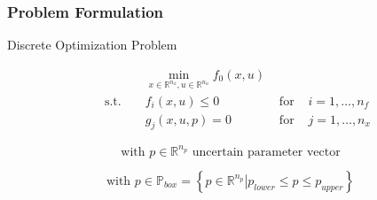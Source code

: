 

\begin{frame}
\frametitle{Problem Formulation}

\begin{block}{Discrete Optimization Problem}
	
\begin{align*}
 &&& \min_{x\in \mathbb{R}^{n_{x}}, u\in \mathbb{R}^{n_{u}}}  f_{0}(x, u)\\
& \text{ s.t. } &&  f_{i}(x,u) \leq 0 & \text{ for } & i=1,\ldots,n_{f}\\
&&&  g_{j}(x,u,p)=0 & \text{ for } & j=1,\ldots,n_{x}
\end{align*}
\begin{overprint}
\begin{equation*}
\text{with } p\in \mathbb{R}^{n_{p}} \text{ uncertain parameter vector}
\end{equation*}

\begin{equation*}
\text{with } p\in\mathbb{P}_{box}=\left\{\left. p\in\mathbb{R}^{n_{p}} \right| p_{lower}\leq p \leq p_{upper}\right\}
\end{equation*}
\end{overprint}
\end{block}


%

%




\end{frame}

